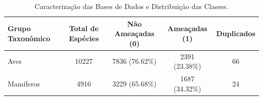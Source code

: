\begin{table}[htbp]
\centering
\caption{Caracterização das Bases de Dados e Distribuição das Classes.}
\label{tab:caracterizacao_bases}
\begin{tabular}{lcccc}
\hline
\textbf{Grupo Taxonômico} & \textbf{Total de Espécies} & \textbf{Não Ameaçadas (0)} & \textbf{Ameaçadas (1)} & \textbf{Duplicados} \\
\hline
Aves & 10227 & 7836 (76.62\%) & 2391 (23.38\%) & 66 \\
Mamíferos & 4916 & 3229 (65.68\%) & 1687 (34.32\%) & 24 \\
\hline
\end{tabular}
\end{table}
